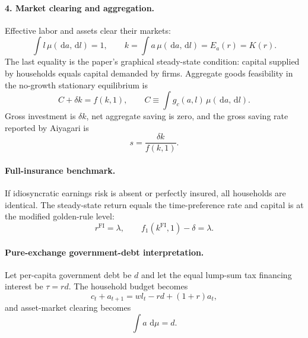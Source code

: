\documentclass[11pt]{article}
\theoremstyle{propertystyle}
\newcommand{\1}{\mathbf{1}}
\newcommand{\dd}{\,\mathrm{d}}
\begin{document}
\paragraph{4. Market clearing and aggregation.}
Effective labor and assets clear their markets:
\begin{equation}
  \int l\,\mu(\dd a,\dd l)=1,
  \qquad
  k=\int a\,\mu(\dd a,\dd l)=E_a(r)=K(r).
  \label{eq:market-clearing}
\end{equation}
The last equality is the paper's graphical steady-state condition: capital
supplied by households equals capital demanded by firms.  Aggregate goods
feasibility in the no-growth stationary equilibrium is
\begin{equation}
  C+\delta k=f(k,1),
  \qquad
  C\equiv\int g_c(a,l)\,\mu(\dd a,\dd l).
  \label{eq:resource-constraint}
\end{equation}
Gross investment is $\delta k$, net aggregate saving is zero, and the gross
saving rate reported by Aiyagari is
\begin{equation}
  s=\frac{\delta k}{f(k,1)}.
  \label{eq:saving-rate}
\end{equation}

\paragraph{Full-insurance benchmark.}
If idiosyncratic earnings risk is absent or perfectly insured, all households
are identical.  The steady-state return equals the time-preference rate and
capital is at the modified golden-rule level:
\begin{equation}
  r^{\mathrm{FI}}=\lambda,
  \qquad f_1(k^{\mathrm{FI}},1)-\delta=\lambda.
  \label{eq:full-insurance}
\end{equation}

\paragraph{Pure-exchange government-debt interpretation.}
Let per-capita government debt be $d$ and let the equal lump-sum tax financing
interest be $\tau=rd$.  The household budget becomes
\begin{equation}
  c_t+a_{t+1}=wl_t-rd+(1+r)a_t,
  \label{eq:debt-budget}
\end{equation}
and asset-market clearing becomes
\begin{equation}
  \int a\,\dd\mu=d.
  \label{eq:debt-clearing}
\end{equation}
\end{document}
